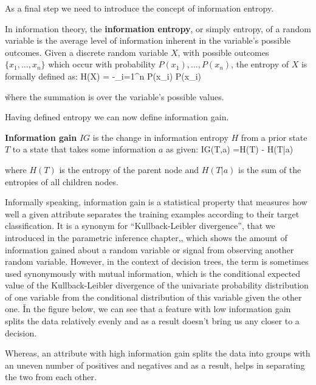 \ee

As a final step we need to introduce the concept of information entropy.

In information theory, the \textbf{information entropy}, or simply entropy, of a random variable is the average level
of information inherent in the variable's possible outcomes. Given a discrete random variable $X$, with possible
outcomes $\{x_{1}, \ldots, x_{n} \}$ which occur with probability $ P(x_{1}), \ldots, P (x_{n})$, the entropy of $X$
is formally defined as:
\bse
H(X) = -\sum _{i=1}^{n} {P(x_{i}) \log P(x_{i})}
\ese

\v

where the summation is over the variable's possible values.
\ed

Having defined entropy we can now define information gain.

\textbf{Information gain} $IG$ is the change in information entropy $H$ from a prior state $T$ to a state that takes
some information $a$ as given:
\bse
IG(T,a) =H(T) - H(T|a)
\ese

where $H(T)$ is the entropy of the parent node and $H(T|a)$ is the sum of the entropies of all children nodes.
\ed

Informally speaking, information gain is a statistical property that measures how well a given attribute separates
the training examples according to their target classification. It is a synonym for ``Kullback-Leibler
divergence'', that we introduced in the parametric inference chapter,, which shows the amount of information gained
about a random variable or signal from observing another random variable. However, in the context of decision trees,
the term is sometimes used synonymously with mutual information, which is the conditional expected value of the
Kullback-Leibler divergence of the univariate probability distribution of one variable from the conditional
distribution of this variable given the other one. \v

In the figure below, we can see that a feature with low information gain splits the data relatively evenly and as a
result doesn't bring us any closer to a decision.


Whereas, an attribute with high information gain splits the data into groups with an uneven number of positives and
negatives and as a result, helps in separating the two from each other.



